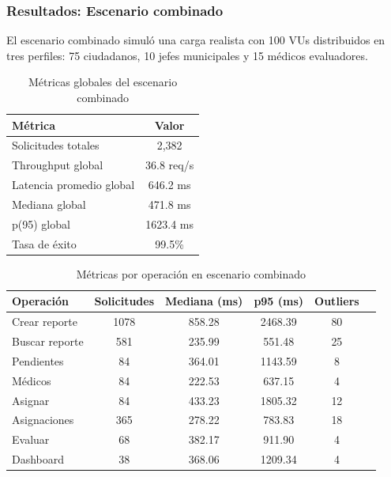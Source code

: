 \documentclass[12pt,letterpaper]{article}
\begin{document}
\subsubsection{Resultados: Escenario combinado}

El escenario combinado simuló una carga realista con 100 VUs distribuidos en tres perfiles: 75 ciudadanos, 10 jefes municipales y 15 médicos evaluadores.

\begin{table}[H]
\centering
\caption{Métricas globales del escenario combinado}
\label{tab:metricas-globales}
\begin{tabular}{|l|c|}
\hline
\textbf{Métrica} & \textbf{Valor} \\ \hline
Solicitudes totales & 2,382 \\ \hline
Throughput global & 36.8 req/s \\ \hline
Latencia promedio global & 646.2 ms \\ \hline
Mediana global & 471.8 ms \\ \hline
p(95) global & 1623.4 ms \\ \hline
Tasa de éxito & 99.5\% \\ \hline
\end{tabular}
\end{table}

\begin{table}[H]
\centering
\caption{Métricas por operación en escenario combinado}
\label{tab:metricas-operaciones}
\footnotesize
\begin{tabular}{|l|c|c|c|c|c|}
\hline
\textbf{Operación} & \textbf{Solicitudes} & \textbf{Mediana (ms)} & \textbf{p95 (ms)} & \textbf{Outliers} \\ \hline
Crear reporte & 1078 & 858.28 & 2468.39 & 80 \\ \hline
Buscar reporte & 581 & 235.99 & 551.48 & 25 \\ \hline
Pendientes & 84 & 364.01 & 1143.59 & 8 \\ \hline
Médicos & 84 & 222.53 & 637.15 & 4 \\ \hline
Asignar & 84 & 433.23 & 1805.32 & 12 \\ \hline
Asignaciones & 365 & 278.22 & 783.83 & 18 \\ \hline
Evaluar & 68 & 382.17 & 911.90 & 4 \\ \hline
Dashboard & 38 & 368.06 & 1209.34 & 4 \\ \hline
\end{tabular}
\end{table}
\end{document}
